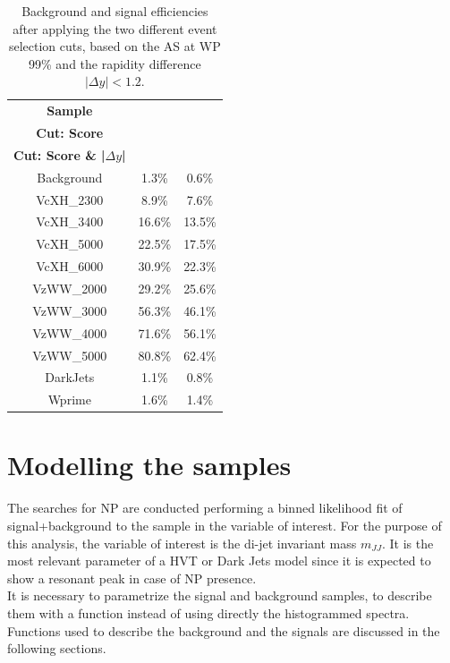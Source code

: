 \begin{table}[ht!]
\centering
\begin{tabular}{|c||c|c|}
\hline
\rowcolor{lightgray}
\textbf{Sample} & \shortstack{\textbf{Efficiency}\\\textbf{Cut: Score}} & \shortstack{\textbf{Efficiency}\\\textbf{Cut: Score \& |$\Delta y$|}} \\
\hline\hline
Background &  1.3\% &   0.6\%  \\
\hline \hline 
VcXH\_2300 &  8.9\%  &   7.6\% \\
\hline 
VcXH\_3400 & 16.6\%  &  13.5\% \\
\hline 
VcXH\_5000 & 22.5\%  &  17.5\% \\
\hline 
VcXH\_6000 & 30.9\%  &  22.3\% \\
\hline \hline 
VzWW\_2000 & 29.2\%  &  25.6\% \\
\hline 
VzWW\_3000 & 56.3\%  &  46.1\% \\
\hline 
VzWW\_4000 & 71.6\%  &  56.1\% \\
\hline 
VzWW\_5000 & 80.8\%  &  62.4\% \\
\hline \hline 
DarkJets   &  1.1\%  &  0.8\% \\
\hline 
Wprime     &  1.6\%   &  1.4\% \\
\hline
\end{tabular}
\caption{Background and signal efficiencies after applying the two different event selection cuts, based on the AS at WP 99\% and the rapidity difference $|\Delta y|<1.2$.}
\label{tab:ADJJ/evSel/cuts}
\end{table}


\section{Modelling the samples}\label{sec:ADJJ/Model}

The searches for NP are conducted performing a binned likelihood fit of signal+background to the sample in the variable of interest.
For the purpose of this analysis, the variable of interest is the di-jet invariant mass $m_{JJ}$.
It is the most relevant parameter of a HVT or Dark Jets model since it is expected to show a resonant peak in case of NP presence.\\
It is necessary to parametrize the signal and background samples, to describe them with a function instead of using directly the histogrammed spectra.
Functions used to describe the background and the signals are discussed in the following sections.

